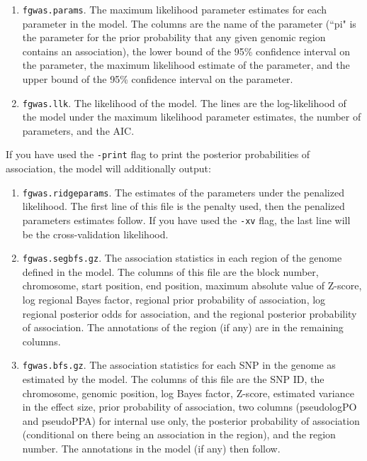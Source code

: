 \documentclass[11pt,titlepage]{article}
\begin{document}
\begin{enumerate}
\item \texttt{fgwas.params}. The maximum likelihood parameter estimates for each parameter in the model. The columns are the name of the parameter (``pi" is the parameter for the prior probability that any given genomic region contains an association), the lower bound of the 95\% confidence interval on the parameter, the maximum likelihood estimate of the parameter, and the upper bound of the 95\% confidence interval on the parameter.
\item \texttt{fgwas.llk}. The likelihood of the model. The lines are the log-likelihood of the model under the maximum likelihood parameter estimates, the number of parameters, and the AIC. 
\end{enumerate}

If you have used the \texttt{-print} flag to print the posterior probabilities of association, the model will additionally output:
\begin{enumerate}
\item \texttt{fgwas.ridgeparams}. The estimates of the parameters under the penalized likelihood. The first line of this file is the penalty used, then the penalized parameters estimates follow. If you have used the \texttt{-xv} flag, the last line will be the cross-validation likelihood.
\item \texttt{fgwas.segbfs.gz}. The association statistics in each region of the genome defined in the model. The columns of this file are the block number, chromosome, start position, end position, maximum absolute value of Z-score, log regional Bayes factor, regional prior probability of association, log regional posterior odds for association, and the regional posterior probability of association. The annotations of the region (if any) are in the remaining columns. 
\item \texttt{fgwas.bfs.gz}. The association statistics for each SNP in the genome as estimated by the model. The columns of this file are the SNP ID, the chromosome, genomic position, log Bayes factor, Z-score, estimated variance in the effect size, prior probability of association, two columns (pseudologPO and pseudoPPA) for internal use only, the posterior probability of association (conditional on there being an association in the region), and the region number. The annotations in the model (if any) then follow. 
\end{enumerate}
\end{document}
